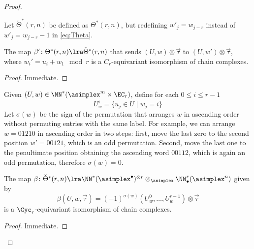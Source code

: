 \begin{proof}
\begin{definition} Let $\check{\Theta}^*(r,n)$ be defined as $\Theta^*(r,n)$, but redefining $w'_j = w_{j-r}$ instead of $w'_j = w_{j-r}-1$ in \eqref{eq:Theta}.
\end{definition}
\begin{lemma}
	The map $\beta'\colon \Theta^*(r,n)\lra \check{\Theta}^*(r,n)$ that sends $(U,w)\otimes \vec{\tau}$ to $(U,w')\otimes \vec{\tau}$, where $w_i' = u_i+w_1\mod r$ is a $C_r$-equivariant isomorphism of chain complexes.
\end{lemma}
\begin{proof} Immediate.
\end{proof}
Given $(U,w)\in \NN^*(\asimplex^m\times \EC_r)$, define for each $0\leq i\leq r-1$
\[U_w^i = \{u_j\in U\mid w_j=i\}\]
Let $\sigma(w)$ be the sign of the permutation that arranges $w$ in ascending order without permuting entries with the same label. For example, we can arrange $w=01210$ in ascending order in two steps: first, move the last zero to the second position $w' = 00121$, which is an odd permutation. Second, move the last one to the penultimate position obtaining the ascending word $00112$, which is again an odd permutation, therefore $\sigma(w) = 0$.
\begin{lemma}
	The map $\beta\colon \check{\Theta}^*(r,n)\lra \NN^*(\asimplex^\bullet)^{\otimes r}\otimes_{\asimplex} \NN_\bullet^r(\asimplex^n)$ given by
	\[\beta(U,w,\vec{\tau}) = (-1)^{\sigma(w)}(U_w^0,\ldots, U_w^{r-1})\otimes \vec{\tau}\]
	is a $\Cyc_r$-equivariant isomorphism of chain complexes.
\end{lemma}
\begin{proof} Immediate.\qedhere

\end{proof}
\end{proof}
